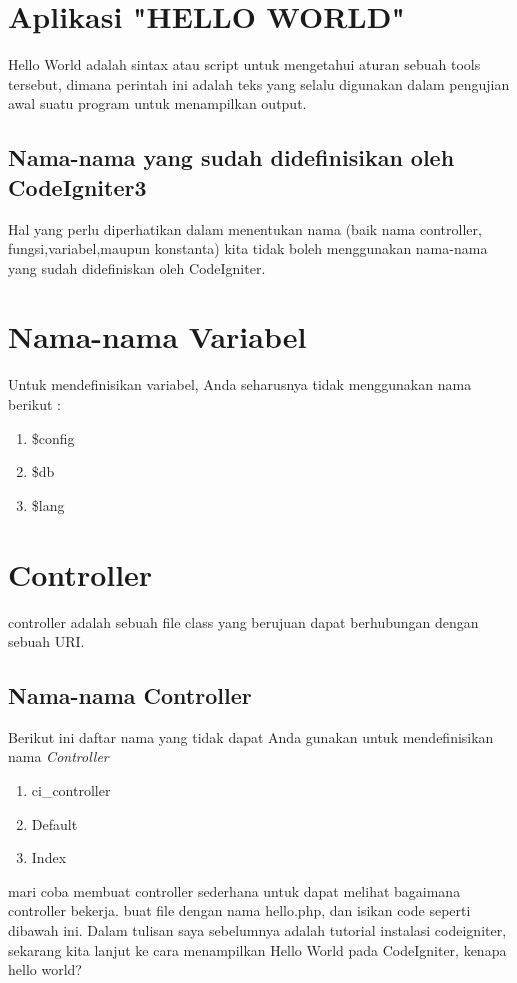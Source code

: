 \section{Aplikasi "HELLO WORLD"}
Hello World adalah sintax atau script untuk mengetahui aturan sebuah tools tersebut, dimana perintah ini adalah teks yang selalu digunakan dalam pengujian awal suatu program untuk menampilkan output.

\subsection{Nama-nama yang sudah didefinisikan oleh CodeIgniter3}
Hal yang perlu diperhatikan dalam menentukan nama (baik nama controller, fungsi,variabel,maupun konstanta) kita tidak boleh menggunakan nama-nama yang sudah didefiniskan oleh CodeIgniter.

\section{Nama-nama Variabel}
Untuk mendefinisikan variabel, Anda seharusnya tidak menggunakan nama berikut :
\begin{enumerate}
\item \$config
\item \$db
\item \$lang
\end{enumerate}

\section{Controller}
controller adalah sebuah file class yang berujuan dapat berhubungan dengan sebuah URI.
\subsection{Nama-nama Controller}
Berikut ini daftar nama yang tidak dapat Anda gunakan untuk mendefinisikan nama \textit{Controller}
\begin{enumerate}
\item ci\_controller
\item  Default
\item Index
\end{enumerate}

mari coba membuat controller sederhana untuk dapat melihat bagaimana controller bekerja. buat file dengan nama hello.php, dan isikan code seperti dibawah ini.
Dalam tulisan saya sebelumnya adalah tutorial instalasi codeigniter, sekarang kita lanjut ke cara menampilkan Hello World pada CodeIgniter, kenapa hello world?

